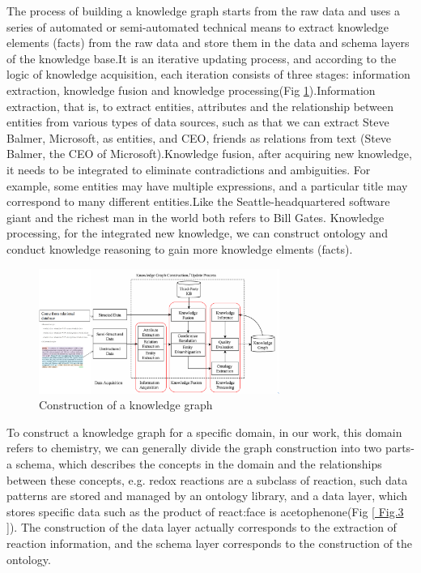 \documentclass[%
 aip,
 jmp,%
 amsmath,amssymb,
 reprint,%
]{revtex4-2}
\begin{document}
The process of building a knowledge graph starts from the raw data and uses a series of automated or 
semi-automated technical means to extract knowledge elements (facts) from the raw data and store them 
in the data and schema layers of the knowledge base.It is an iterative updating process, and according 
to the logic of knowledge acquisition, each iteration consists of three stages: information extraction, 
knowledge fusion and knowledge processing(Fig \ref{ Fig.1 }).Information extraction, that is, to extract 
entities, attributes and the relationship between entities from various types of data sources, 
such as that we can extract Steve Balmer, Microsoft, as entities, and CEO, friends as relations from
text (Steve Balmer, the CEO of Microsoft).Knowledge fusion, after acquiring new knowledge, it needs to be 
integrated to eliminate contradictions and ambiguities. For example, some entities may have multiple 
expressions, and a particular title may correspond to many different entities.Like the Seattle-headquartered 
software giant and the richest man in the world both refers to Bill Gates. Knowledge processing, for the integrated new knowledge, 
we can construct ontology and conduct knowledge reasoning to gain more knowledge elments (facts). 

\begin{figure}[htbp]
 \centering
 \includegraphics[width=0.7\textwidth]{figure/1.png}
 \caption{ Construction of a knowledge graph }
 \label{ Fig.1 }
\end{figure}

To construct a knowledge graph for a specific domain, in our work, this domain refers to chemistry, we can generally divide the graph 
construction into two parts-a schema, which describes the concepts in the domain and the relationships 
between these concepts, e.g. redox reactions are a subclass of reaction, such data patterns are stored and 
managed by an ontology library, and a data layer, which stores specific data such as the 
product of react:face is acetophenone(Fig \ref{ Fig.3 }). The construction of the data layer actually 
corresponds to the extraction of reaction information, and the schema layer corresponds 
to the construction of the ontology. 
\end{document}
